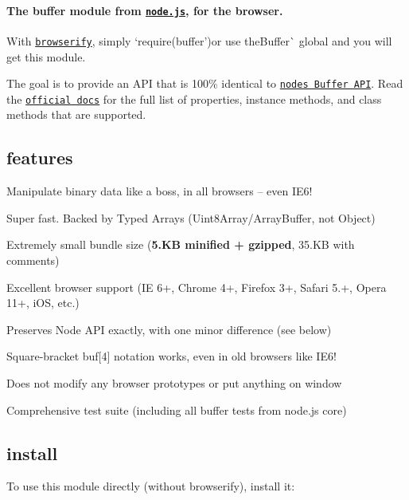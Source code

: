 \paragraph*{The buffer module from \href{https://nodejs.org/}{\tt node.\+js}, for the browser.}

\href{https://saucelabs.com/u/buffer}{\tt }

With \href{http://browserify.org}{\tt browserify}, simply `require(\textquotesingle{}buffer'){\ttfamily or use the}Buffer\`{} global and you will get this module.

The goal is to provide an A\+PI that is 100\% identical to \href{https://nodejs.org/api/buffer.html}{\tt node\textquotesingle{}s Buffer A\+PI}. Read the \href{https://nodejs.org/api/buffer.html}{\tt official docs} for the full list of properties, instance methods, and class methods that are supported.

\subsection*{features}


\begin{DoxyItemize}
\item Manipulate binary data like a boss, in all browsers -- even I\+E6!
\item Super fast. Backed by Typed Arrays ({\ttfamily Uint8\+Array}/{\ttfamily Array\+Buffer}, not {\ttfamily Object})
\item Extremely small bundle size ({\bfseries 5.\+KB minified + gzipped}, 35.\+KB with comments)
\item Excellent browser support (IE 6+, Chrome 4+, Firefox 3+, Safari 5.+, Opera 11+, i\+OS, etc.)
\item Preserves Node A\+PI exactly, with one minor difference (see below)
\item Square-\/bracket {\ttfamily buf\mbox{[}4\mbox{]}} notation works, even in old browsers like I\+E6!
\item Does not modify any browser prototypes or put anything on {\ttfamily window}
\item Comprehensive test suite (including all buffer tests from node.\+js core)
\end{DoxyItemize}

\subsection*{install}

To use this module directly (without browserify), install it\+:


